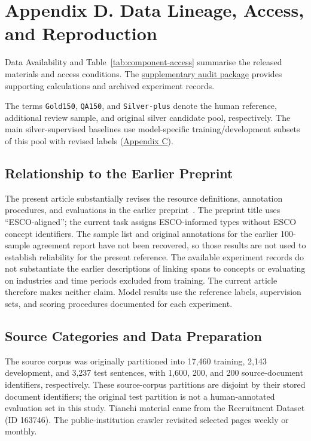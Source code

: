 \section{Appendix D. Data Lineage, Access, and Reproduction}
\label{app:d}
\label{sec:extension-provenance}
\label{sec:display-archive-r14}

Data Availability and Table~\ref{tab:component-access} summarise the released materials and access conditions. The \href{https://github.com/AlfredJamesLi/chinese-skillspan-benchmark/tree/main/reproduction/major_revision_20261004}{supplementary audit package} provides supporting calculations and archived experiment records.

\begin{samepage}
The terms \texttt{Gold150}, \texttt{QA150}, and \texttt{Silver-plus} denote the human reference, additional review sample, and original silver candidate pool, respectively. The main silver-supervised baselines use model-specific training/development subsets of this pool with revised labels (\hyperref[sec:jobbert-label-versions]{Appendix C}).\par
\end{samepage}

\subsection{Relationship to the Earlier Preprint}
The present article substantially revises the resource definitions, annotation procedures, and evaluations in the earlier preprint~\citep{li2026chineseskillspanpreprint}. The preprint title uses ``ESCO-aligned''; the current task assigns ESCO-informed types without ESCO concept identifiers. The sample list and original annotations for the earlier 100-sample agreement report have not been recovered, so those results are not used to establish reliability for the present reference. The available experiment records do not substantiate the earlier descriptions of linking spans to concepts or evaluating on industries and time periods excluded from training. The current article therefore makes neither claim. Model results use the reference labels, supervision sets, and scoring procedures documented for each experiment.

\subsection{Source Categories and Data Preparation}
The source corpus was originally partitioned into 17,460 training, 2,143 development, and 3,237 test sentences, with 1,600, 200, and 200 source-document identifiers, respectively. These source-corpus partitions are disjoint by their stored document identifiers; the original test partition is not a human-annotated evaluation set in this study. Tianchi material came from the Recruitment Dataset (ID 163746). The public-institution crawler revisited selected pages weekly or monthly.

